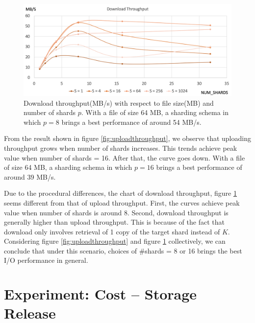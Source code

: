 \begin{figure}[hbt]
\centering
  \includegraphics[width=14cm]{charts/chart_download_throughput.png}
  \caption[Download throughput with respect to file size and number of shards]{Download throughput(MB/s) with respect to file size(MB) and number of shards $p$. With a file of size 64 MB, a sharding schema in which $p=8$ brings a best performance of around 54 MB/s.}
  \label{fig:downloadthroughput}
\end{figure}

From the result shown in figure \ref{fig:uploadthroughput}, we observe that uploading throughput grows when number of shards increases. This trends achieve peak value when number of shards = 16. After that, the curve goes down. With a file of size 64 MB, a sharding schema in which $p=16$ brings a best performance of around 39 MB/s.

Due to the procedural differences, the chart of download throughput, figure \ref{fig:downloadthroughput} seems different from that of upload throughput. First, the curves achieve peak value when number of shards is around 8. Second, download throughput is generally higher than upload throughput. This is because of the fact that download only involves retrieval of 1 copy of the target shard instead of $K$. Considering figure \ref{fig:uploadthroughput} and figure \ref{fig:downloadthroughput} collectively, we can conclude that under this scenario, choices of \#shards = 8 or 16 brings the best I/O performance in general.

\section{Experiment: Cost -- Storage Release}
\label{s:expcoststoragerelease}

